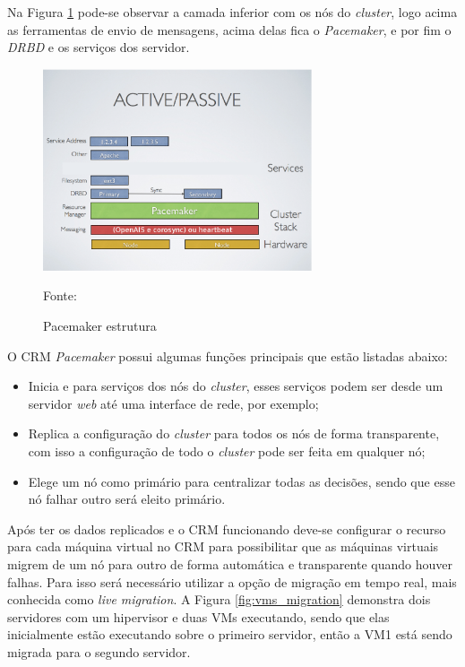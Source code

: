 Na Figura \ref{fig:pacemaker_tools} pode-se observar a camada inferior com os nós do \textit{cluster}, logo acima as ferramentas de envio de 
mensagens, acima delas fica o \textit{Pacemaker}, e por fim o \textit{DRBD} e os serviços dos servidor.

\begin{figure}[h!]
 \centering
 \includegraphics[width=300px]{img/pacemaker_tools.eps}
 \caption{Pacemaker estrutura}
 Fonte: \citet{pacemaker}
 \label{fig:pacemaker_tools}
\end{figure}


O \ac{CRM} \textit{Pacemaker} possui algumas funções principais que estão listadas abaixo:
\begin{itemize}
 \item Inicia e para serviços dos nós do \textit{cluster}, esses serviços podem ser desde um servidor \textit{web} até uma interface de rede, 
 por exemplo;
 \item Replica a configuração do \textit{cluster} para todos os nós de forma transparente, com isso a configuração de todo o \textit{cluster} 
 pode ser feita em qualquer nó;
 \item Elege um nó como primário para centralizar todas as decisões, sendo que esse nó falhar outro será eleito primário.
\end{itemize}

Após ter os dados replicados e o \ac{CRM} funcionando deve-se configurar o recurso para cada máquina virtual no \ac{CRM} para possibilitar que as
máquinas virtuais migrem de um nó para outro de forma automática e transparente quando houver falhas. Para isso será necessário utilizar a 
opção de migração em tempo real, mais conhecida como \textit{live migration}.
A Figura \ref{fig:vms_migration} demonstra dois servidores com um hipervisor e duas \ac{VM}s executando, sendo que elas inicialmente estão 
executando sobre o primeiro servidor, então a \ac{VM}1 está sendo migrada para o segundo servidor.

